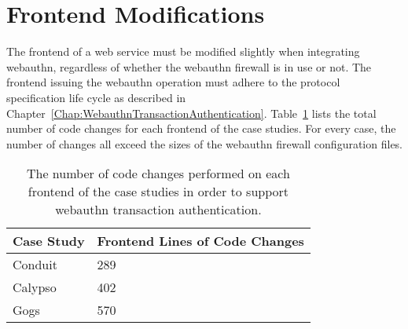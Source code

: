 







\section{Frontend Modifications}

The frontend of a web service must be modified slightly when integrating webauthn, regardless of whether the webauthn firewall is in use or not. The frontend issuing the webauthn operation must adhere to the protocol specification life cycle as described in Chapter~\ref{Chap:WebauthnTransactionAuthentication}. Table~\ref{Table:EvaluationsFrontendModifications} lists the total number of code changes for each frontend of the case studies. For every case, the number of changes all exceed the sizes of the webauthn firewall configuration files.

\begin{table}[h]
\centering

\begin{tabular}{ m{4.5cm} m{6cm}  } 
 \hline
 Case Study & Frontend Lines of Code Changes \\ 
 \hline \hline

 Conduit & 289 \\ \hline

 Calypso & 402 \\ \hline

 Gogs & 570 \\ \hline

\end{tabular}
\caption{The number of code changes performed on each frontend of the case studies in order to support webauthn transaction authentication.}
\label{Table:EvaluationsFrontendModifications}
\end{table}


